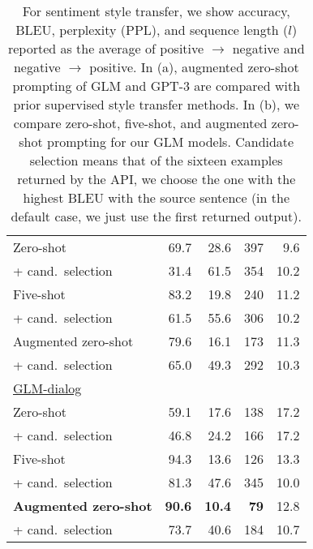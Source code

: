 \begin{table}
\begin{subtable}{.40\linewidth}
\begin{tabular}{l r r r r}
        Zero-shot & 69.7 & 28.6 & 397 & 9.6 \\
        + cand.~selection & 31.4 & 61.5 & 354 & 10.2 \\
        Five-shot & 83.2 & 19.8 & 240 & 11.2 \\
        + cand.~selection & 61.5 & 55.6 & 306 & 10.2 \\
        Augmented zero-shot & 79.6 & 16.1 & 173 & 11.3 \\
        + cand.~selection & 65.0 & 49.3 & 292 & 10.3 \\
        \midrule
        \underline{GLM-dialog} \\
        Zero-shot & 59.1 & 17.6 & 138 & 17.2 \\
        + cand.~selection & 46.8 & 24.2 & 166 & 17.2  \\
        Five-shot & 94.3 & 13.6 & 126 & 13.3 \\
        + cand.~selection & 81.3 & 47.6 & 345 & 10.0 \\
        \textbf{Augmented zero-shot} & \textbf{90.6} & \textbf{10.4} & \textbf{79} & 12.8 \\
        + cand.~selection & 73.7 & 40.6 & 184 & 10.7 \\
        \bottomrule
        \end{tabular}
        \caption{}
        \label{tab:ablation}
    \end{subtable}
    \vspace{3mm}
\caption{
For sentiment style transfer, we show accuracy, BLEU, perplexity (PPL), and sequence length ($l$) reported as the average of positive $\rightarrow$ negative and negative $\rightarrow$ positive. 
In (a), augmented zero-shot prompting of GLM and GPT-3 are compared with prior supervised style transfer methods.
In (b), we compare zero-shot, five-shot, and augmented zero-shot prompting for our GLM models. 
Candidate selection means that of the sixteen examples returned by the API, we choose the one with the highest BLEU with the source sentence (in the default case, we just use the first returned output).  
}
\end{table}
